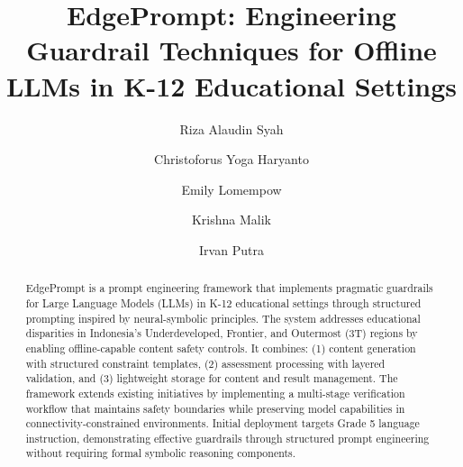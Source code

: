 \documentclass[sigconf]{acmart}
\begin{document}
\title{EdgePrompt: Engineering Guardrail Techniques for Offline LLMs in K-12 Educational Settings}

\author{Riza Alaudin Syah}

\author{Christoforus Yoga Haryanto}
\authornotemark[1]

\author{Emily Lomempow}

\author{Krishna Malik}

\author{Irvan Putra}

\renewcommand{\shortauthors}{Syah et al.}

\begin{abstract}
EdgePrompt is a prompt engineering framework that implements pragmatic guardrails for Large Language Models (LLMs) in K-12 educational settings through structured prompting inspired by neural-symbolic principles. The system addresses educational disparities in Indonesia's Underdeveloped, Frontier, and Outermost (3T) regions by enabling offline-capable content safety controls. It combines: (1) content generation with structured constraint templates, (2) assessment processing with layered validation, and (3) lightweight storage for content and result management. The framework extends existing initiatives by implementing a multi-stage verification workflow that maintains safety boundaries while preserving model capabilities in connectivity-constrained environments. Initial deployment targets Grade 5 language instruction, demonstrating effective guardrails through structured prompt engineering without requiring formal symbolic reasoning components.
\end{abstract}
\end{document}
